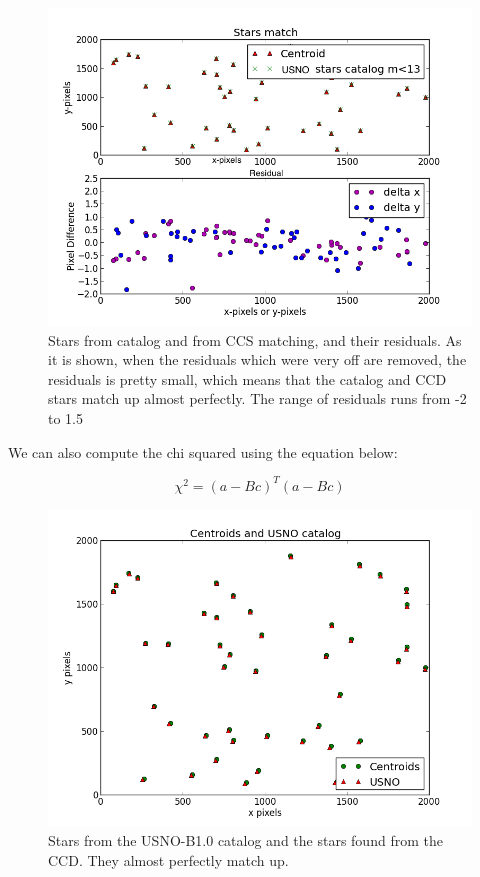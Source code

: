 \documentclass[letterpaper,12pt]{article}
\begin{document}
\FloatBarrier
\begin{figure}[h!]
\centering
\includegraphics[scale=0.5]{stars_match_2.png}
\caption{Stars from catalog and from CCS matching, and their residuals. As it is shown, when the residuals which were very off are removed, the residuals is pretty small, which means that the catalog and CCD stars match up almost perfectly. The range of residuals runs from -2 to 1.5}
\end{figure}
\FloatBarrier



We can also compute the chi squared using the equation below:

\begin{equation}
\chi^2 = (a-Bc)^T(a-Bc)
\end{equation}



\FloatBarrier
\begin{figure}[h!]
\centering
\includegraphics[scale=0.5]{centroids_catalog_together.png}
\caption{Stars from the USNO-B1.0 catalog and the stars found from the CCD. They almost perfectly match up.}
\end{figure}
\FloatBarrier
\end{document}
